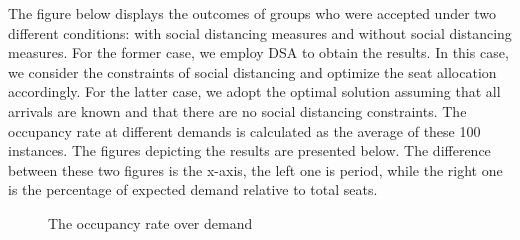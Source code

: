 

The figure below displays the outcomes of groups who were accepted under two different conditions: with social distancing measures and without social distancing measures. For the former case, we employ DSA to obtain the results. In this case, we consider the constraints of social distancing and optimize the seat allocation accordingly. For the latter case, we adopt the optimal solution assuming that all arrivals are known and that there are no social distancing constraints. The occupancy rate at different demands is calculated as the average of these 100 instances. The figures depicting the results are presented below. The difference between these two figures is the x-axis, the left one is period, while the right one is the percentage of expected demand relative to total seats. 


\begin{figure}[h]
  \centering
  \caption{The occupancy rate over demand}
  \label{Fig.lable}
\end{figure}

